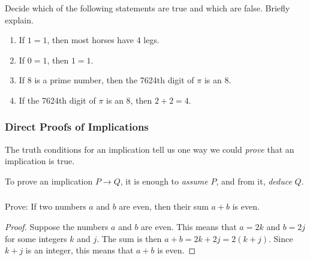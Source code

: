 \documentclass[11pt, compress]{beamer}
\newcommand{\imp}{\rightarrow}
\begin{document}
\begin{frame}
\frametitle{}
\begin{example}[0.2.3]Decide which of the following statements are true and which are false. Briefly explain.\begin{enumerate}
\item{} If \(1=1\), then most horses have 4 legs.


\item{} If \(0=1\), then \(1=1\).


\item{} If 8 is a prime number, then the 7624th digit of \(\pi\) is an 8.


\item{} If the 7624th digit of \(\pi\) is an 8, then \(2+2 = 4\).

\end{enumerate}

\end{example}
\end{frame}
 
\begin{frame}
\frametitle{Direct Proofs of Implications}
 The truth conditions for an implication tell us one way we could \emph{prove} that an implication is true.
 
\pause \vfill 

To prove an implication \(P \imp Q\), it is enough to \emph{assume} \(P\), and from it, \emph{deduce} \(Q\).
\end{frame}
 
\begin{frame}
\frametitle{}
\begin{example}[0.2.4]Prove: If two numbers \(a\) and \(b\) are even, then their sum \(a+b\) is even.
\end{example}
 \begin{proof}
\pause \vfill 

Suppose the numbers \(a\) and \(b\) are even. This means that \(a = 2k\) and \(b=2j\) for some integers \(k\) and \(j\). The sum is then \(a+b = 2k+2j = 2(k+j)\). Since \(k+j\) is an integer, this means that \(a+b\) is even.
\end{proof}\end{frame}
 
\end{document}
